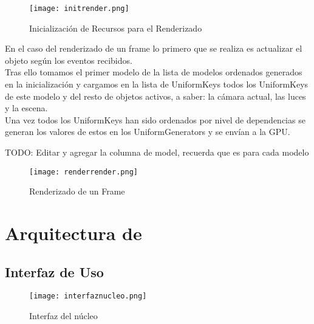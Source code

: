 \begin{figure}[h!]
\begin{center}
\texttt{[image: initrender.png]}
\end{center}
\caption[Inicialización de Recursos para el Renderizado]{Inicialización de Recursos para el Renderizado}
\label{fig:initrender}
\end{figure}

En el caso del renderizado de un frame lo primero que se realiza es actualizar el objeto según los eventos recibidos.\\
Tras ello tomamos el primer modelo de la lista de modelos ordenados generados en la inicialización y cargamos en la lista de UniformKeys todos los UniformKeys de este modelo y del resto de objetos activos, a saber: la cámara actual, las luces y la escena.\\
Una vez todos los UniformKeys han sido ordenados por nivel de dependencias se generan los valores de estos en los UniformGenerators y se envían a la GPU.

TODO: Editar y agregar la columna de model, recuerda que es para cada modelo
\begin{figure}[h!]
\begin{center}
\texttt{[image: renderrender.png]}
\end{center}
\caption[Renderizado de un Frame]{Renderizado de un Frame}
\label{fig:renderrender}
\end{figure}




\section{Arquitectura de \robotto}

\subsection{Interfaz de Uso}

\begin{figure}[h!]
\begin{center}
\texttt{[image: interfaznucleo.png]}
\end{center}
\caption[Interfaz del núcleo]{Interfaz del núcleo}
\label{fig:interfaznucleo}
\end{figure}

